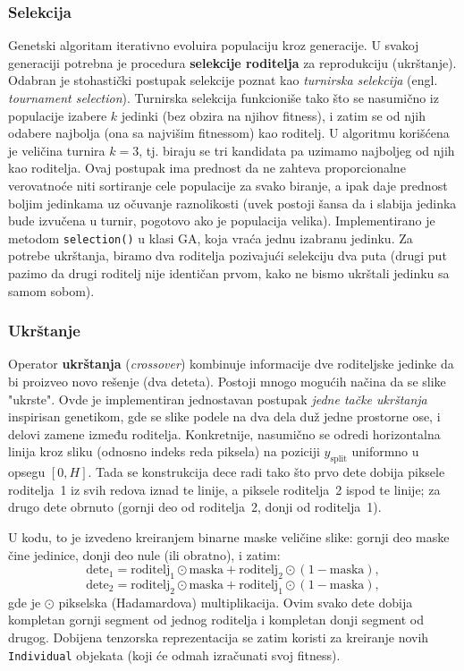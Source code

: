 \documentclass[a4paper,12pt]{article}
\begin{document}
\subsubsection{Selekcija}
Genetski algoritam iterativno evoluira populaciju kroz generacije. U svakoj generaciji potrebna je procedura \textbf{selekcije roditelja} za reprodukciju (ukrštanje). Odabran je stohastički postupak selekcije poznat kao \emph{turnirska selekcija} (engl. \emph{tournament selection}). Turnirska selekcija funkcioniše tako što se nasumično iz populacije izabere $k$ jedinki (bez obzira na njihov fitness), i zatim se od njih odabere najbolja (ona sa najvišim fitnessom) kao roditelj. U algoritmu korišćena je veličina turnira $k=3$, tj. biraju se tri kandidata pa uzimamo najboljeg od njih kao roditelja. Ovaj postupak ima prednost da ne zahteva proporcionalne verovatnoće niti sortiranje cele populacije za svako biranje, a ipak daje prednost boljim jedinkama uz očuvanje raznolikosti (uvek postoji šansa da i slabija jedinka bude izvučena u turnir, pogotovo ako je populacija velika). Implementirano je metodom \texttt{selection()} u klasi GA, koja vraća jednu izabranu jedinku. Za potrebe ukrštanja, biramo dva roditelja pozivajući selekciju dva puta (drugi put pazimo da drugi roditelj nije identičan prvom, kako ne bismo ukrštali jedinku sa samom sobom).

\subsubsection{Ukrštanje}
Operator \textbf{ukrštanja} (\emph{crossover}) kombinuje informacije dve roditeljske jedinke da bi proizveo novo rešenje (dva deteta). Postoji mnogo mogućih načina da se slike "ukrste". Ovde je implementiran jednostavan postupak \emph{jedne tačke ukrštanja} inspirisan genetikom, gde se slike podele na dva dela duž jedne prostorne ose, i delovi zamene između roditelja. Konkretnije, nasumično se odredi horizontalna linija kroz sliku (odnosno indeks reda piksela) na poziciji $y_{\text{split}}$ uniformno u opsegu $[0, H]$. Tada se konstrukcija dece radi tako što prvo dete dobija piksele roditelja~1 iz svih redova iznad te linije, a piksele roditelja~2 ispod te linije; za drugo dete obrnuto (gornji deo od roditelja~2, donji od roditelja~1). 

U kodu, to je izvedeno kreiranjem binarne maske veličine slike: gornji deo maske čine jedinice, donji deo nule (ili obratno), i zatim:
\[
\text{dete}_1 = \text{roditelj}_1 \odot \text{maska} + \text{roditelj}_2 \odot (1-\text{maska}),
\]
\[
\text{dete}_2 = \text{roditelj}_2 \odot \text{maska} + \text{roditelj}_1 \odot (1-\text{maska}),
\]
gde je $\odot$ pikselska (Hadamardova) multiplikacija. Ovim svako dete dobija kompletan gornji segment od jednog roditelja i kompletan donji segment od drugog. Dobijena tenzorska reprezentacija se zatim koristi za kreiranje novih \texttt{Individual} objekata (koji će odmah izračunati svoj fitness).
\end{document}
